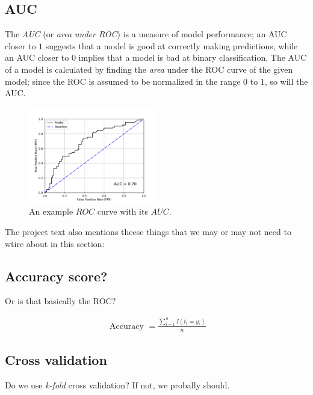 \documentclass[a4paper,10pt,english]{article}
\begin{document}
\begin{multicols*}{2}
\subsection*{AUC}

The \textit{AUC} (or \textit{area under ROC}) is a measure of model performance; an AUC closer to $1$ suggests that a model is good at correctly making predictions, while an AUC closer to $0$ implies that a model is bad at binary classification.  The AUC of a model is calculated by finding the \textit{area} under the ROC curve of the given model; since the ROC is assumed to be normalized in the range $0$ to $1$, so will the AUC.

\begin{figure}[H]
	\centering
	\includegraphics[width = 0.5\textwidth, center]{roc_sample.pdf}
	\caption{An example $ROC$ curve with its $AUC$.\label{fig_roc_sample}}
\end{figure}


The project text also mentions theese things that we may or may not need to wtire about in this section:

\subsection*{Accuracy score?}

Or is that basically the ROC?

\begin{align*}
\text { Accuracy }=\frac{\sum_{i=1}^{n} I\left(t_{i}=y_{i}\right)}{n}
\end{align*}


\subsection*{Cross validation}

Do we use \textit{k-fold} cross validation? If not, we probally should.



\end{multicols*}
\end{document}
